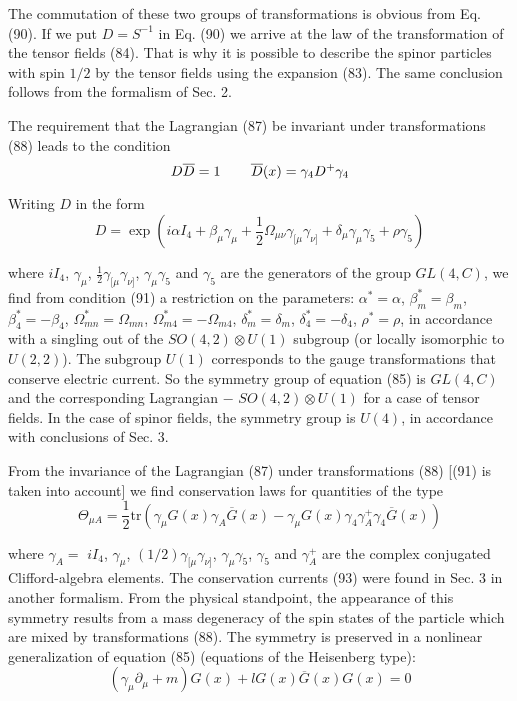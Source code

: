 \documentclass[a4paper,12pt]{article}
\begin{document}
The commutation of these two groups of transformations is obvious from Eq.
(90). If we put $D=S^{-1}$ in Eq. (90) we arrive at the law of the
transformation of the tensor fields (84). That is why it is possible to
describe the spinor particles with spin $1/2$ by the tensor fields using the
expansion (83). The same conclusion follows from the formalism of Sec. 2.

The requirement that the Lagrangian (87) be invariant under transformations
(88) leads to the condition
\begin{equation}
D\overline{D}=1\hspace{0.3in}\overline{D}(x)=\gamma _4D^{+}\gamma _4
\label{91}
\end{equation}

Writing $D$ in the form
\begin{equation}
D=\exp \left( i\alpha I_4+\beta _\mu \gamma _\mu +\frac 12\Omega _{\mu \nu
}\gamma _{[\mu }\gamma _{\nu ]}+\delta _\mu \gamma _\mu \gamma _5+\rho
\gamma _5\right)  \label{92}
\end{equation}

where $iI_4$, $\gamma _\mu $, $\frac 12\gamma _{[\mu }\gamma _{\nu
]}$, $ \gamma _\mu \gamma _5$ and $\gamma _5$ are the generators
of the group $ GL(4,C)$, we find from condition (91) a restriction
on the parameters: $ \alpha ^{*}=\alpha $, $\beta _m^{*}=\beta
_m$, $\beta _4^{*}=-\beta _4$, $ \Omega _{mn}^{*}=\Omega _{mn}$,
$\Omega _{m4}^{*}=-\Omega _{m4}$, $\delta _m^{*}=\delta _m$,
$\delta _4^{*}=-\delta _4$, $\rho ^{*}=\rho $, in accordance with
a singling out of the $SO(4,2)\otimes U(1)$ subgroup (or locally
isomorphic to $U(2,2)$). The subgroup $U(1)$ corresponds to the
gauge transformations that conserve electric current. So the
symmetry group of equation (85) is $GL(4,C)$ and the corresponding
Lagrangian $-$ $ SO(4,2)\otimes U(1)$ for a case of tensor fields.
In the case of spinor fields, the symmetry group is $U(4)$, in
accordance with conclusions of Sec. 3.

From the invariance of the Lagrangian (87) under transformations (88) [(91)
is taken into account] we find conservation laws for quantities of the type
\begin{equation}
\Theta _{\mu A}=\frac 12\mbox{tr}\left( \gamma _\mu G(x)\gamma
_A\overline{G} (x)-\gamma _\mu G(x)\gamma _4\gamma _A^{+}\gamma
_4\overline{G}(x)\right) \label{93}
\end{equation}

where $\gamma _A=$ $iI_4$, $\gamma _\mu $, $(1/2)\gamma _{[\mu }\gamma _{\nu
]}$, $\gamma _\mu \gamma _5$, $\gamma _5$ and $\gamma _A^{+}$ are the
complex conjugated Clifford-algebra elements. The conservation currents (93)
were found in Sec. 3 in another formalism. From the physical standpoint, the
appearance of this symmetry results from a mass degeneracy of the spin
states of the particle which are mixed by transformations (88). The symmetry
is preserved in a nonlinear generalization of equation (85) (equations of
the Heisenberg type):
\begin{equation}
\left( \gamma _\mu \partial _\mu +m\right) G(x)+lG(x)\overline{G}(x)G(x)=0
\label{94}
\end{equation}
\end{document}
